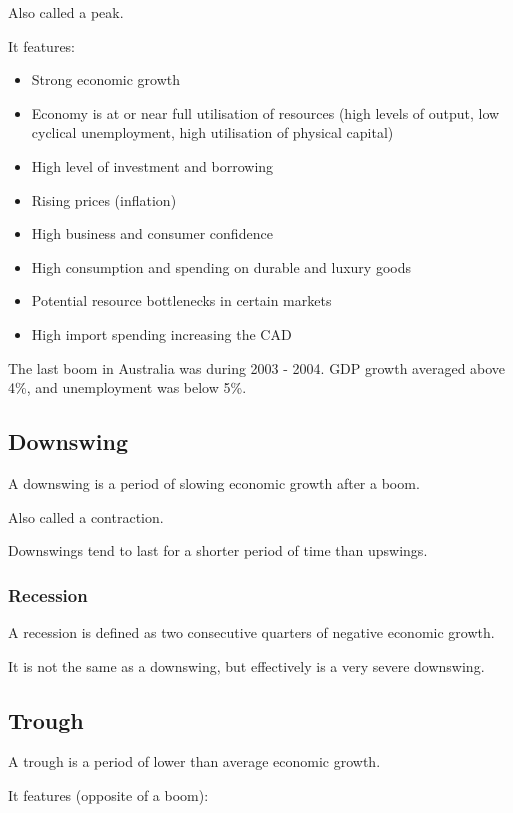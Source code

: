 \documentclass[a4paper,11pt]{report}
\begin{document}
Also called a peak.

It features:

\begin{itemize}
\item Strong economic growth
\item Economy is at or near full utilisation of resources (high levels of
	output, low cyclical unemployment, high utilisation of physical capital)
\item High level of investment and borrowing
\item Rising prices (inflation)
\item High business and consumer confidence
\item High consumption and spending on durable and luxury goods
\item Potential resource bottlenecks in certain markets
\item High import spending increasing the CAD
\end{itemize}

The last boom in Australia was during 2003 - 2004. GDP growth averaged above
4\%, and unemployment was below 5\%.

\subsection{Downswing}

A downswing is a period of slowing economic growth after a boom.

Also called a contraction.

Downswings tend to last for a shorter period of time than upswings.

\subsubsection{Recession}

A recession is defined as two consecutive quarters of negative economic growth.

It is not the same as a downswing, but effectively is a very severe downswing.

\subsection{Trough}

A trough is a period of lower than average economic growth.

It features (opposite of a boom):
\end{document}
